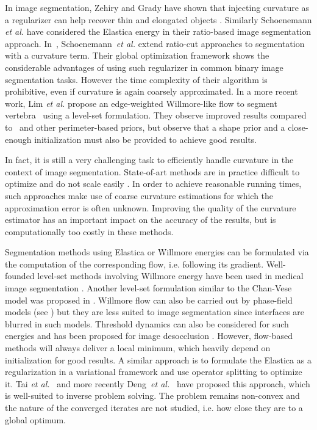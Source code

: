 \documentclass[smallextended]{svjour3}       %
\begin{document}
In image segmentation, Zehiry and Grady have shown that injecting
curvature as a regularizer can help recover thin and elongated objects
\cite{zehiry10fast}. Similarly Schoenemann {\em et al.}
\cite{schoenemann09linear} have considered the Elastica energy in
their ratio-based image segmentation
approach. In~\cite{schoenemann2011elastic}, Schoenemann~{\em et al.}
extend ratio-cut approaches to segmentation with a curvature
term. Their global optimization framework shows the considerable
advantages of using such regularizer in common binary image
segmentation tasks.  However the time complexity of their algorithm
is prohibitive, even if curvature is again coarsely
approximated.  In a more recent work, Lim {\em et al.} propose an
edge-weighted Willmore-like flow to segment
vertebra~\cite{lim2012introducing} using a level-set
formulation. They observe improved results compared
to~\cite{casseles97geodesic} and other perimeter-based priors, but
observe that a shape prior and a close-enough initialization must also be
provided to achieve good results.

In fact, it is still a very challenging task to efficiently handle
curvature in the context of image segmentation.  State-of-art methods
are in practice difficult to optimize and do not scale easily
\cite{zehiry10fast,schoenemann09linear,strandmark11globalframework,nieuwenhuis14efficient}. In
order to achieve reasonable running times, such approaches make use of
coarse curvature estimations for which the approximation error is
often unknown. Improving the quality of the curvature estimator has an
important impact on the accuracy of the results, but is
computationally too costly in these methods.

Segmentation methods using Elastica or Willmore energies can be
formulated via the computation of the corresponding flow,
i.e. following its gradient. Well-founded level-set methods involving
Willmore energy \cite{droske2004level} have been used in medical image
segmentation \cite{lim2012introducing}. Another level-set formulation
similar to the Chan-Vese model was proposed in
\cite{zhu2013image}. Willmore flow can also be carried out by
phase-field models (see \cite{bretin2015phase}) but they are less
suited to image segmentation since interfaces are blurred in such
models. Threshold dynamics can also be considered for such energies
\cite{esedoglu2008threshold} and has been proposed for image
desocclusion \cite{esedoglu2005threshold}. However, flow-based methods
will always deliver a local minimum, which heavily depend on
initialization for good results. A similar approach is to formulate
the Elastica as a regularization in a variational framework and use
operator splitting to optimize it. Tai {\em et
  al.}~\cite{tai11elastica} and more recently Deng~{\em et
  al.}~\cite{deng2019new} have proposed this approach, which is
well-suited to inverse problem solving. The problem remains non-convex
and the nature of the converged iterates are not studied, i.e. how
close they are to a global optimum.
\end{document}
